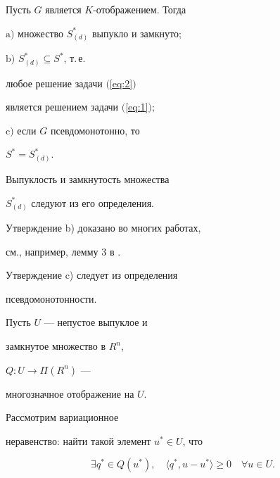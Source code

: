 \begin{prop}


\label{pro:1}


Пусть $G$ является $K$-отображением. Тогда





$\mathrm{a)}$ множество $ S^{*}_{(d)}$ выпукло и замкнуто$;$





$\mathrm{b)}$  $ S^{*}_{(d)} \subseteq S^{*}$, т.\,е.


любое решение задачи $($\ref{eq:2}$)$


является решением задачи $($\ref{eq:1}$);$





$\mathrm{c)}$  если $G$ псевдомонотонно, то


$ S^{*} = S^{*}_{(d)}$.


\end{prop}





\begin{pf}


Выпуклость и замкнутость множества


$ S^{*}_{(d)}$ следуют из его определения.


Утверждение b) доказано во многих работах,


см., например, лемму 3 в \cite{ST88}.


Утверждение c) следует из определения


псевдомонотонности.


\end{pf}





Пусть $U$ --- непустое выпуклое и


замкнутое множество в $R^{n}$,


$Q: U \longrightarrow \Pi (R^{n})$ ---


многозначное отображение на $U$.


Рассмотрим вариационное


неравенство: найти такой элемент $ u^{*}\in U $, что


\begin{equation}


\label{eq:10}


\exists q^{*}\in Q(u^{*}), \quad


\langle q^{*}, u-u^{*} \rangle \geq 0 \quad \forall u \in U.


\end{equation}


